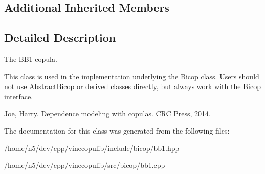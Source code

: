 \subsection*{Additional Inherited Members}


\subsection{Detailed Description}
The B\+B1 copula. 

This class is used in the implementation underlying the \hyperlink{classvinecopulib_1_1_bicop}{Bicop} class. Users should not use \hyperlink{classvinecopulib_1_1_abstract_bicop}{Abstract\+Bicop} or derived classes directly, but always work with the \hyperlink{classvinecopulib_1_1_bicop}{Bicop} interface.

Joe, Harry. Dependence modeling with copulas. C\+RC Press, 2014. 

The documentation for this class was generated from the following files\+:\begin{DoxyCompactItemize}
\item 
/home/n5/dev/cpp/vinecopulib/include/bicop/bb1.\+hpp\item 
/home/n5/dev/cpp/vinecopulib/src/bicop/bb1.\+cpp\end{DoxyCompactItemize}
